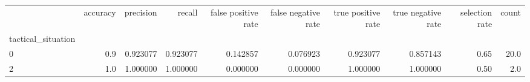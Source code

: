 \begin{tabular}{lrrrrrrrrr}
\toprule
{} &  accuracy &  precision &    recall &  false positive rate &  false negative rate &  true positive rate &  true negative rate &  selection rate &  count \\
tactical\_situation &           &            &           &                      &                      &                     &                     &                 &        \\
\midrule
0                  &       0.9 &   0.923077 &  0.923077 &             0.142857 &             0.076923 &            0.923077 &            0.857143 &            0.65 &   20.0 \\
2                  &       1.0 &   1.000000 &  1.000000 &             0.000000 &             0.000000 &            1.000000 &            1.000000 &            0.50 &    2.0 \\
\bottomrule
\end{tabular}
